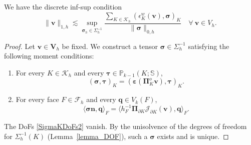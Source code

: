 \documentclass[review,hidelinks,onefignum,onetabnum]{siamart251216}
\begin{document}
\begin{lemma} \label{lem:discinf-sup}
We have the discrete inf-sup condition
\begin{equation}\label{eq:discinfsup}
\|\boldsymbol{v}\|_{1,h}\lesssim \sup_{\boldsymbol{\sigma}_h\in\Sigma_h^{-1}}
\frac{\sum_{K\in\mathcal{K}_h}(\epsilon_K^w(\boldsymbol{v}), \boldsymbol{\sigma})_K}{\|\boldsymbol{\sigma}\|_{0,h}}\quad\forall~\boldsymbol{v}\in V_h.
\end{equation}
\end{lemma}
\begin{proof}
Let \(\boldsymbol{v}\in \boldsymbol{V}_h\) be fixed. We construct a tensor \(\boldsymbol{\sigma}\in\Sigma_h^{-1}\) satisfying the following moment conditions:
\begin{enumerate}
\item[(i)] For every \(K\in\mathcal{K}_h\) and every \(\boldsymbol{\tau}\in\mathbb{P}_{k-1}(K;\mathbb{S})\),
\[
(\boldsymbol{\sigma}, \boldsymbol{\tau})_K
= (\boldsymbol{\varepsilon}(\boldsymbol{\Pi}_K^o \boldsymbol{v}), \boldsymbol{\tau})_K.
\]
\item[(ii)] For every face \(F\in\mathcal{F}_h\) and every \(\boldsymbol{q}\in V_k(F)\),
\[
\langle \boldsymbol{\sigma}\boldsymbol{n}, \boldsymbol{q} \rangle_F
= \langle h_F^{-1} \boldsymbol{\Pi}_{\partial K}\mathcal{J}_{\partial K}(\boldsymbol{v}), \boldsymbol{q} \rangle_F.
\]
\end{enumerate}
The DoFs \eqref{SigmaKDoFs2} vanish.
By the unisolvence of the degrees of freedom for \(\Sigma_h^{-1}(K)\) (Lemma~\ref{lemma_DOF}), such a \(\boldsymbol{\sigma}\) exists and is unique.


\end{proof}
\end{document}
